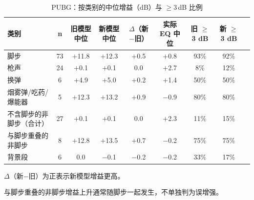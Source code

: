\begin{table}[htbp]\centering
\caption{PUBG：按类别的中位增益（dB）与 $\geq$3\,dB 比例}\label{tab:nm_class}
{\footnotesize\begin{threeparttable}
\begin{tabular}{lcccccccc}\toprule
类别 & n & 旧模型中位 & 新模型中位 & $\Delta$（新$-$旧） & 实际 EQ 中位 & 旧 $\geq$3 dB & 新 $\geq$3 dB \\
\midrule
脚步 & 73 & $+$11.8 & $+$12.3 & $+$0.5 & $+$0.8 & 93\% & 92\% \\
枪声 & 24 & $+$0.1 & $+$0.1 & 0.0 & $+$2.7 & 8\% & 12\% \\
换弹 & 6 & $+$4.9 & $+$5.0 & $+$0.2 & $+$1.4 & 50\% & 50\% \\
烟雾弹/吃药/爆能器 & 5 & $+$12.3 & $+$13.2 & $+$0.9 & $-$0.9 & 80\% & 80\% \\
不含脚步的非脚步（合计） & 27 & $+$0.1 & $+$0.1 & 0.0 & $+$2.3 & 11\% & 15\% \\
与脚步重叠的非脚步 & 8 & $+$12.8 & $+$13.5 & $+$0.7 & $-$0.2 & 75\% & 75\% \\
背景段 & 6 & 0.0 & $-$0.1 & $-$0.2 & $-$0.2 & 33\% & 17\% \\
\bottomrule\end{tabular}
\begin{tablenotes}\footnotesize\item $\Delta$（新$-$旧）为正表示新模型增益更高。\item 与脚步重叠的非脚步增益上升通常随脚步一起发生，不单独判为误增强。\end{tablenotes}\end{threeparttable}}
\end{table}
